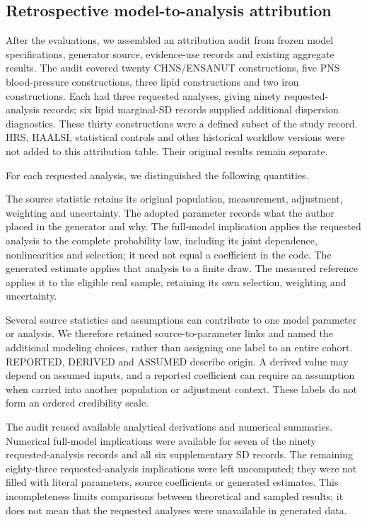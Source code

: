 \documentclass[11pt,letterpaper]{article}
\begin{document}
\subsection{Retrospective model-to-analysis attribution}

After the evaluations, we assembled an attribution audit from frozen model specifications, generator source, evidence-use records and existing aggregate results. The audit covered twenty CHNS/\allowbreak{}ENSANUT constructions, five PNS blood-pressure constructions, three lipid constructions and two iron constructions. Each had three requested analyses, giving ninety requested-analysis records; six lipid marginal-SD records supplied additional dispersion diagnostics. These thirty constructions were a defined subset of the study record. HRS, HAALSI, statistical controls and other historical workflow versions were not added to this attribution table. Their original results remain separate.


For each requested analysis, we distinguished the following quantities.


The source statistic retains its original population, measurement, adjustment, weighting and uncertainty. The adopted parameter records what the author placed in the generator and why. The full-model implication applies the requested analysis to the complete probability law, including its joint dependence, nonlinearities and selection; it need not equal a coefficient in the code. The generated estimate applies that analysis to a finite draw. The measured reference applies it to the eligible real sample, retaining its own selection, weighting and uncertainty.


Several source statistics and assumptions can contribute to one model parameter or analysis. We therefore retained source-to-parameter links and named the additional modeling choices, rather than assigning one label to an entire cohort. REPORTED, DERIVED and ASSUMED describe origin. A derived value may depend on assumed inputs, and a reported coefficient can require an assumption when carried into another population or adjustment context. These labels do not form an ordered credibility scale.


The audit reused available analytical derivations and numerical summaries. Numerical full-model implications were available for seven of the ninety requested-analysis records and all six supplementary SD records. The remaining eighty-three requested-analysis implications were left uncomputed; they were not filled with literal parameters, source coefficients or generated estimates. This incompleteness limits comparisons between theoretical and sampled results; it does not mean that the requested analyses were unavailable in generated data.
\end{document}
